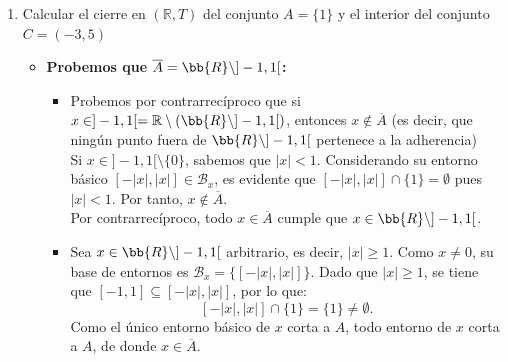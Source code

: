 \documentclass[12pt]{article}
\begin{document}
\begin{ejercicio}
\begin{enumerate}
        Ahora veremos que no cumple el segundo axioma de numerabilidad. Supongamos por reducción al absurdo que $(\bb{R}, T)$ es (2AN). Como $\mathcal{B}$ es una base de la topología $T$, por ser (2AN) existirá una subfamilia numerable $\mathcal{B}_n \subseteq \mathcal{B}$ que también es base de $T$:
        \[
            \mathcal{B}_n = \{[-r_n, r_n] : n \in \bb{N}\} \quad \text{con } r_n \in \bb{R}^+.
        \]
        Sea $R = \{r_n : n \in \bb{N}\} \subseteq \bb{R}^+$. Como $R$ es numerable y $\bb{R}^+$ es no numerable, se tiene que $\bb{R}^+ \setminus R \neq \emptyset$.
        
        Tomemos $x \in \bb{R}^+ \setminus R \Rightarrow [-x, x] \in \mathcal{B} \subseteq T$, por lo que es abierto y debe expresarse como unión de elementos de $\mathcal{B}_N$:
        \[
            [-x, x] = \bigcup_{n \in J} [-r_n, r_n] \quad \text{para algún } J \subseteq \bb{N}.
        \]
        Como $x \in [-x, x]$, existe algún $n_0 \in J$ tal que $x \in [-r_{n_0}, r_{n_0}]$, lo que implica que $x \le r_{n_0}$. Por otro lado, como $[-r_{n_0}, r_{n_0}] \subseteq [-x, x]$, también se cumple que $r_{n_0} \le x$. De ambas desigualdades deducimos que $r_{n_0} = x$, lo cual es una contradicción pues $x \notin R$. Por tanto, no existe base numerable y $(\bb{R}, T)$ NO es (2AN).
            
        \item Calcular el cierre en $(\mathbb{R}, T)$ del conjunto $A=\{1\}$ y el interior del conjunto $C=(-3,5)$
        \begin{itemize}
    \item \textbf{Probemos que $\overline{A} = \bb{R} \setminus ]-1, 1[$:}
    \begin{itemize}
        \item[$\subseteq$)] Probemos por contrarrecíproco que si $x \in ]-1, 1[ = \mathbb{R}\setminus(\bb{R}\setminus ]-1,1[)$, entonces $x \notin \overline{A}$ (es decir, que ningún punto fuera de $\bb{R} \setminus ]-1, 1[$ pertenece a la adherencia)\\
        Si $x \in ]-1, 1[ \setminus \{0\}$, sabemos que $|x| < 1$. Considerando su entorno básico $[-|x|, |x|] \in \mathcal{B}_x$, es evidente que $[-|x|, |x|] \cap \{1\} = \emptyset$ pues $|x| < 1$. Por tanto, $x \notin \overline{A}$. \\
        Por contrarrecíproco, todo $x \in \overline{A}$ cumple que $x \in \bb{R} \setminus ]-1, 1[$.

        \item[$\supseteq$)] Sea $x \in \bb{R} \setminus ]-1, 1[$ arbitrario, es decir, $|x| \ge 1$. Como $x \neq 0$, su base de entornos es $\mathcal{B}_x = \{[-|x|, |x|]\}$. Dado que $|x| \ge 1$, se tiene que $[-1, 1] \subseteq [-|x|, |x|]$, por lo que:
        \[
            [-|x|, |x|] \cap \{1\} = \{1\} \neq \emptyset.
        \]
        Como el único entorno básico de $x$ corta a $A$, todo entorno de $x$ corta a $A$, de donde $x \in \overline{A}$.
    \end{itemize}


\end{itemize}
\end{enumerate}
\end{ejercicio}
\end{document}

